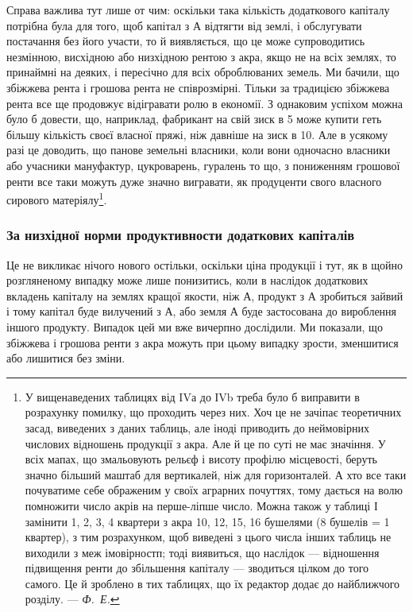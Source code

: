 Справа важлива тут лише от чим: оскільки така кількість додаткового
капіталу потрібна була для того, щоб капітал з $А$ відтягти від землі, і обслугувати
постачання без його участи, то й виявляється, що це може супроводитись
незмінною, висхідною або низхідною рентою з акра, якщо не на всіх землях, то
принаймні на деяких, і пересічно для всіх оброблюваних земель. Ми бачили, що
збіжжева рента і грошова рента не співрозмірні. Тільки за традицією збіжжева
рента все ще продовжує відігравати ролю в економії. З однаковим успіхом можна
було б довести, що, наприклад, фабрикант на свій зиск в 5 може купити
геть більшу кількість своєї власної пряжі, ніж давніше на зиск в 10.
Але в усякому разі це доводить, що панове земельні власники, коли вони одночасно
власники або учасники мануфактур, цукроварень, гуралень то що, з пониженням
грошової ренти все таки можуть дуже значно вигравати, як продуценти
свого власного сирового матеріялу\footnote{
У вищенаведених таблицях від IVа до ІVb треба було б виправити в розрахунку помилку, що
проходить через них. Хоч це не зачіпає теоретичних засад, виведених з даних таблиць, але іноді
приводить до неймовірних числових відношень продукції з акра. Але й це по суті не має значіння. У
всіх мапах, що змальовують рельєф і висоту профілю місцевості, беруть значно більший маштаб для
вертикалей, ніж для горизонталей. А хто все таки почуватиме себе ображеним у своїх аграрних
почуттях, тому дається на волю помножити число акрів на перше-ліпше число. Можна також у таблиці І
замінити 1, 2, 3, 4 квартери з акра 10, 12, 15, 16 бушелями (8 бушелів = 1 квартер), з тим
розрахунком, щоб виведені з цього числа інших таблиць не виходили з меж імовірностп; тоді виявиться,
що наслідок — відношення підвищення ренти до збільшення капіталу — зводиться цілком до того самого.
Це й зроблено в тих таблицях, що їх редактор додає до найближчого розділу. —\emph{ Ф.~Е.}
}.

\subsubsection{За низхідної норми продуктивности додаткових капіталів}

Це не викликає нічого нового остільки, оскільки ціна продукції і тут, як
в щойно розгляненому випадку може лише понизитись, коли в наслідок додаткових
вкладень капіталу на землях кращої якости, ніж $А$, продукт з $А$ зробиться
зайвий і тому капітал буде вилучений з $А$, або земля $А$ буде застосована до вироблення
іншого продукту. Випадок цей ми вже вичерпно дослідили. Ми показали,
що збіжжева і грошова ренти з акра можуть при цьому випадку зрости,
зменшитися або лишитися без зміни.
